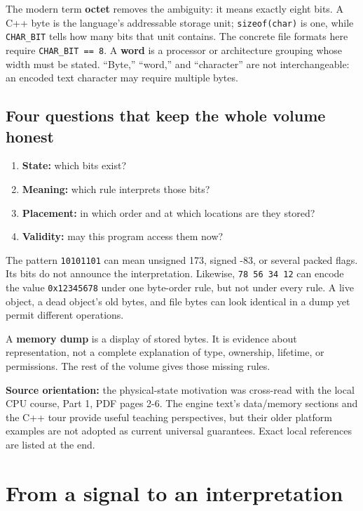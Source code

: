 The modern term \textbf{octet} removes the ambiguity: it means exactly eight bits. A C++ byte is the language's addressable storage unit; \texttt{sizeof(char)} is one, while \texttt{CHAR\_BIT} tells how many bits that unit contains. The concrete file formats here require \texttt{CHAR\_BIT\ ==\ 8}. A \textbf{word} is a processor or architecture grouping whose width must be stated. ``Byte,'' ``word,'' and ``character'' are not interchangeable: an encoded text character may require multiple bytes.

\subsection{Four questions that keep the whole volume honest}\label{01-foundations-i-ch001-four-questions-that-keep-the-whole-volume-honest}

\begin{enumerate}
\def\labelenumi{\arabic{enumi}.}
\tightlist
\item
  \textbf{State:} which bits exist?
\item
  \textbf{Meaning:} which rule interprets those bits?
\item
  \textbf{Placement:} in which order and at which locations are they stored?
\item
  \textbf{Validity:} may this program access them now?
\end{enumerate}

The pattern \texttt{10101101} can mean unsigned 173, signed -83, or several packed flags. Its bits do not announce the interpretation. Likewise, \texttt{78\ 56\ 34\ 12} can encode the value \texttt{0x12345678} under one byte-order rule, but not under every rule. A live object, a dead object's old bytes, and file bytes can look identical in a dump yet permit different operations.

A \textbf{memory dump} is a display of stored bytes. It is evidence about representation, not a complete explanation of type, ownership, lifetime, or permissions. The rest of the volume gives those missing rules.

\textbf{Source orientation:} the physical-state motivation was cross-read with the local CPU course, Part 1, PDF pages 2-6. The engine text's data/memory sections and the C++ tour provide useful teaching perspectives, but their older platform examples are not adopted as current universal guarantees. Exact local references are listed at the end.

\section{From a signal to an interpretation}\label{01-foundations-i-ch001-from-a-signal-to-an-interpretation}

